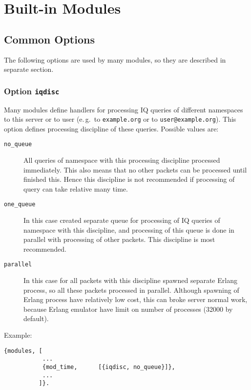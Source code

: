 \documentclass[10pt]{article}
\begin{document}
\appendix{}

\section{Built-in Modules}
\label{sec:modules}

\subsection{Common Options}
\label{sec:modcommonopts}

The following options are used by many modules, so they are described in
separate section.

\subsubsection{Option \texttt{iqdisc}}

Many modules define handlers for processing IQ queries of different namespaces
to this server or to user (e.\,g.\ to \texttt{example.org} or to
\texttt{user@example.org}).  This option defines processing discipline of
these queries.  Possible values are:
\begin{description}
\item[\texttt{no\_queue}] All queries of namespace with this processing
  discipline processed immediately.  This also means that no other packets can
  be processed until finished this.  Hence this discipline is not recommended
  if processing of query can take relative many time.
\item[\texttt{one\_queue}] In this case created separate queue for processing
  of IQ queries of namespace with this discipline, and processing of this queue
  is done in parallel with processing of other packets. This discipline is most
  recommended.
\item[\texttt{parallel}] In this case for all packets with this discipline
  spawned separate Erlang process, so all these packets processed in parallel.
  Although spawning of Erlang process have relatively low cost, this can broke
  server normal work, because Erlang emulator have limit on number of processes
  (32000 by default).
\end{description}

Example:
\begin{verbatim}
{modules, [
           ...
           {mod_time,      [{iqdisc, no_queue}]},
           ...
          ]}.
\end{verbatim}
\end{document}
